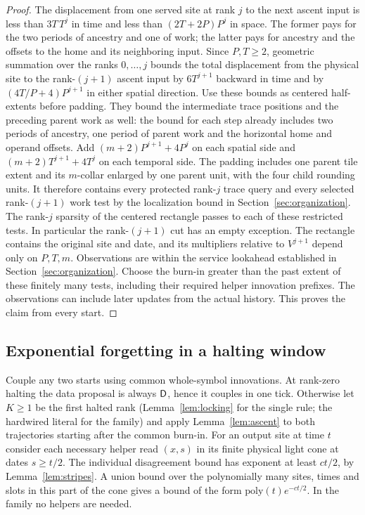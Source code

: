 \begin{proof}
The displacement from one served site at rank \(j\) to the next ascent input is less than \(3T\,T^j\) in time and less than \((2T+2P)P^j\) in space. The former pays for the two periods of ancestry and one of work; the latter pays for ancestry and the offsets to the home and its neighboring input. Since \(P,T\ge2\), geometric summation over the ranks \(0,\ldots,j\) bounds the total displacement from the physical site to the rank-\((j+1)\) ascent input by \(6T^{j+1}\) backward in time and by \((4T/P+4)P^{j+1}\) in either spatial direction. Use these bounds as centered half-extents before padding. They bound the intermediate trace positions and the preceding parent work as well: the bound for each step already includes two periods of ancestry, one period of parent work and the horizontal home and operand offsets. Add \((m+2)P^{j+1}+4P^j\) on each spatial side and \((m+2)T^{j+1}+4T^j\) on each temporal side. The padding includes one parent tile extent and its \(m\)-collar enlarged by one parent unit, with the four child rounding units. It therefore contains every protected rank-\(j\) trace query and every selected rank-\((j+1)\) work test by the localization bound in Section~\ref{sec:organization}. The rank-\(j\) sparsity of the centered rectangle passes to each of these restricted tests. In particular the rank-\((j+1)\) cut has an empty exception. The rectangle contains the original site and date, and its multipliers relative to \(V^{j+1}\) depend only on \(P,T,m\). Observations are within the service lookahead established in Section~\ref{sec:organization}. Choose the burn-in greater than the past extent of these finitely many tests, including their required helper innovation prefixes. The observations can include later updates from the actual history. This proves the claim from every start.
\end{proof}

\subsection{Exponential forgetting in a halting window}\label{sec:halting}

Couple any two starts using common whole-symbol innovations. At rank-zero halting the data proposal is always \(\mathsf D\), hence it couples in one tick. Otherwise let \(K\ge1\) be the first halted rank (Lemma~\ref{lem:locking} for the single rule; the hardwired literal for the family) and apply Lemma~\ref{lem:ascent} to both trajectories starting after the common burn-in. For an output site at time \(t\) consider each necessary helper read \((x,s)\) in its finite physical light cone at dates \(s\ge t/2\). The individual disagreement bound has exponent at least \(ct/2\), by Lemma~\ref{lem:stripes}. A union bound over the polynomially many sites, times and slots in this part of the cone gives a bound of the form \(\mathrm{poly}(t)e^{-ct/2}\). In the family no helpers are needed.


